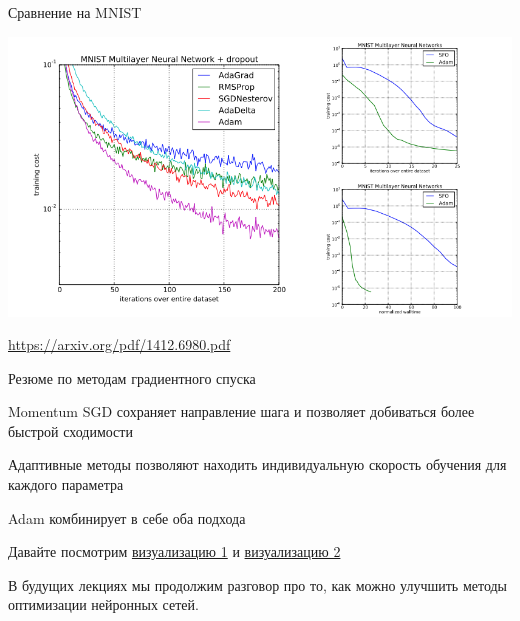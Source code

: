 \documentclass[notes,12pt, aspectratio=169]{beamer}
\newenvironment{wideitemize}{\itemize\addtolength{\itemsep}{10pt}}{\enditemize}
\begin{document}
\begin{frame}{Сравнение на MNIST}
\begin{center}
\includegraphics[scale=0.4]{adam_mnist.png}
\end{center}
\vfill %
\footnotesize
{\color{blue} \url{https://arxiv.org/pdf/1412.6980.pdf}}
\end{frame}




\begin{frame}{Резюме по методам градиентного спуска}
\begin{wideitemize}
\item Momentum SGD сохраняет направление шага и позволяет добиваться более быстрой сходимости
\item  Адаптивные методы позволяют находить индивидуальную скорость обучения для каждого параметра
\item Adam комбинирует в себе оба подхода
\item Давайте посмотрим \href{http://ruder.io/content/images/2016/09/contours_evaluation_optimizers.gif}{визуализацию 1} и \href{http://ruder.io/content/images/2016/09/saddle_point_evaluation_optimizers.gif}{визуализацию 2}
\item \alert{В будущих лекциях мы продолжим разговор про то, как можно улучшить методы оптимизации нейронных сетей.} 
\end{wideitemize}
\end{frame}
\end{document}
